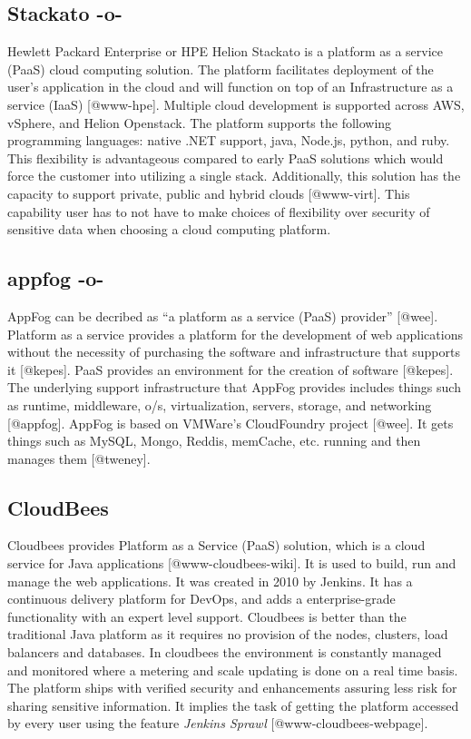 \subsection{Stackato -o-}
    
Hewlett Packard Enterprise or HPE Helion Stackato is a platform as a
service (PaaS) cloud computing solution.  The platform facilitates
deployment of the user's application in the cloud and will function on
top of an Infrastructure as a service (IaaS) [@www-hpe]. Multiple
cloud development is supported across AWS, vSphere, and Helion
Openstack.  The platform supports the following programming languages:
native .NET support, java, Node.js, python, and ruby.  This
flexibility is advantageous compared to early PaaS solutions which
would force the customer into utilizing a single stack.  Additionally,
this solution has the capacity to support private, public and hybrid
clouds [@www-virt]. This capability user has to not have to make
choices of flexibility over security of sensitive data when choosing a
cloud computing platform.


 
    
\subsection{appfog -o-}

AppFog can be decribed as ``a platform as a service (PaaS)
provider'' [@wee]. Platform as a service provides a platform for
the development of web applications without the necessity of
purchasing the software and infrastructure that supports
it [@kepes]. PaaS provides an environment for the creation of
software [@kepes]. The underlying support infrastructure that
AppFog provides includes things such as runtime, middleware, o/s,
virtualization, servers, storage, and networking [@appfog]. AppFog
is based on VMWare's CloudFoundry project [@wee]. It gets things
such as MySQL, Mongo, Reddis, memCache, etc. running and then manages
them [@tweney].


    
\subsection{CloudBees}

Cloudbees provides Platform as a Service (PaaS) solution, which is a
cloud service for Java applications [@www-cloudbees-wiki]. It is
used to build, run and manage the web applications. It was created in
2010 by Jenkins. It has a continuous delivery platform for DevOps, and
adds a enterprise-grade functionality with an expert level
support. Cloudbees is better than the traditional Java platform as it
requires no provision of the nodes, clusters, load balancers and
databases. In cloudbees the environment is constantly managed and
monitored where a metering and scale updating is done on a real time
basis. The platform ships with verified security and enhancements
assuring less risk for sharing sensitive information. It implies the
task of getting the platform accessed by every user using the feature
\textit{Jenkins Sprawl} [@www-cloudbees-webpage].

